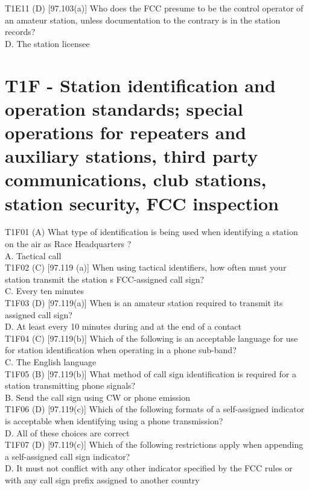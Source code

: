 \documentclass[12pt,letterpaper]{report}
\begin{document}
T1E11 (D) [97.103(a)] Who does the FCC presume to be the control operator of an amateur station, unless documentation to the contrary is in the station records?\\
D. The station licensee\\

\section{T1F - Station identification and operation standards; special operations for repeaters and auxiliary stations, third party communications, club stations, station security, FCC inspection}

T1F01 (A) What type of identification is being used when identifying a station on the air as  Race Headquarters ?\\
A. Tactical call\\

T1F02 (C) [97.119 (a)] When using tactical identifiers, how often must your station transmit the station s FCC-assigned call sign? \\
C. Every ten minutes\\

T1F03 (D) [97.119(a)] When is an amateur station required to transmit its assigned call sign?\\
D. At least every 10 minutes during and at the end of a contact\\

T1F04 (C) [97.119(b)] Which of the following is an acceptable language for use for station identification when operating in a phone sub-band?\\
C. The English language\\

T1F05 (B) [97.119(b)] What method of call sign identification is required for a station transmitting phone signals?\\
B. Send the call sign using CW or phone emission\\

T1F06 (D) [97.119(c)] Which of the following formats of a self-assigned indicator is acceptable when identifying using a phone transmission?\\
D. All of these choices are correct\\

T1F07 (D) [97.119(c)] Which of the following restrictions apply when appending a self-assigned call sign indicator?\\
D. It must not conflict with any other indicator specified by the FCC rules or with any call sign prefix assigned to another country\\
\end{document}

